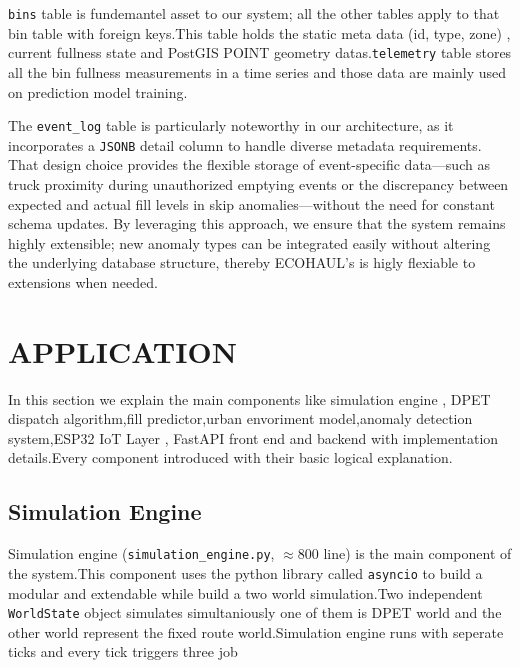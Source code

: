 \documentclass[12pt,a4paper]{report}
\begin{document}
\indent \texttt{bins} table is fundemantel asset to our system; all the other tables apply to that bin table with foreign keys.This table holds the static meta data (id, type, zone) , current fullness state and PostGIS POINT geometry datas.\texttt{telemetry} table stores all the bin fullness measurements in a time series and those data are mainly used on prediction model training.



\indent The \texttt{event\_log} table is particularly noteworthy in our architecture, as it incorporates a \texttt{JSONB} detail column to handle diverse metadata requirements. That design choice provides the flexible storage of event-specific data—such as truck proximity during unauthorized emptying events or the discrepancy between expected and actual fill levels in skip anomalies—without the need for constant schema updates. By leveraging this approach, we ensure that the system remains highly extensible; new anomaly types can be integrated easily without altering the underlying database structure, thereby ECOHAUL's is higly flexiable to extensions when needed.
\chapter{APPLICATION}

\indent In this section we explain the main components like simulation engine , DPET dispatch algorithm,fill predictor,urban envoriment model,anomaly detection system,ESP32 IoT Layer , FastAPI front end and backend with implementation details.Every component  introduced with their basic logical explanation.

\section{Simulation Engine}

\indent Simulation engine (\texttt{simulation\_engine.py}, $\approx$800 line) is the main component of the system.This component uses the python library called   \texttt{asyncio}  to build a modular and extendable while build a two world simulation.Two independent  \texttt{WorldState}  object simulates simultaniously  one of them is DPET world and the other world represent the fixed route world.Simulation engine runs with seperate ticks and every tick triggers three job
\end{document}

